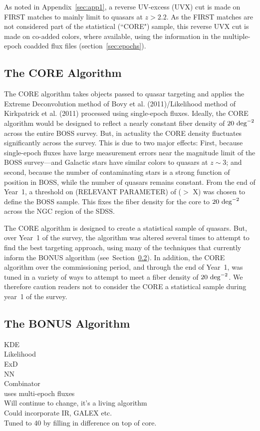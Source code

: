 \documentclass{emulateapj}
\begin{document}
As noted in Appendix~\ref{sec:app1}, a reverse UV-excess (UVX) cut
is made on FIRST matches to mainly limit to quasars at $z > 2.2$.
As the FIRST matches are not considered part of the statistical
(``CORE") sample, this reverse UVX cut is made on co-added colors, where
available, using the information in the multiple-epoch coadded flux
files (section~\ref{sec:epochs}).

\subsection{The CORE Algorithm}

The CORE algorithm takes objects passed to quasar targeting and applies
the Extreme Deconvolution method of Bovy et al. (2011)/Likelihood method
of Kirkpatrick et al. (2011) processed using single-epoch fluxes.
Ideally, the CORE algorithm would be designed to reflect a nearly
constant fiber density of $20~{\rm deg}^{-2}$ across the entire BOSS
survey. But, in actuality the CORE density fluctuates significantly
across the survey. This is due to two major effects: First, because
single-epoch fluxes have large measurement errors near the magnitude
limit of the BOSS survey---and Galactic stars have similar colors to
quasars at $z\sim3$; and second, because the number of contaminating
stars is a strong function of position in BOSS, while the number of
quasars remains constant. From the end of Year~1, a threshold on
(RELEVANT PARAMETER) of ($>$ X) was chosen to define the BOSS sample.
This fixes the fiber density for the core to $20~{\rm deg}^{-2}$ across
the NGC region of the SDSS.

The CORE algorithm is designed to create a statistical sample of
quasars. But, over Year~1 of the survey, the algorithm was altered
several times to attempt to find the best targeting approach, using
many of the techniques that currently inform the BONUS algorithm
(see~Section~\ref{sec:BONUS}). In addition, the CORE algorithm over
the commissioning period, and through the end of Year~1, was tuned
in a variety of ways to attempt to meet a fiber density of $20~{\rm
deg}^{-2}$. We therefore caution readers not to consider the CORE a
statistical sample during year~1 of the survey.

\subsection{The BONUS Algorithm}
\label{sec:BONUS}

KDE \\
Likelihood\\
ExD\\
NN\\
Combinator\\
uses multi-epoch fluxes\\
Will continue to change, it's a living algorithm\\
Could incorporate IR, GALEX etc.\\
Tuned to 40 by filling in difference on top of core.\\
	
\end{document}
